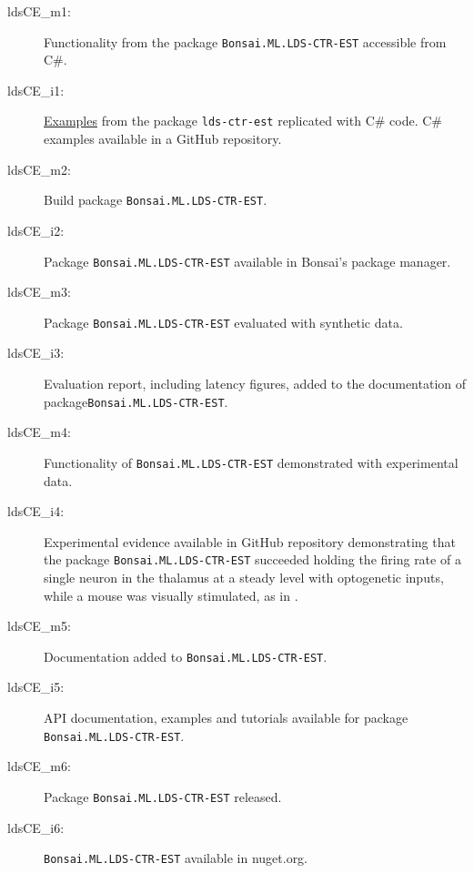 \begin{description}

    \item[ldsCE\_m1:] Functionality from the package
        \texttt{Bonsai.ML.LDS-CTR-EST} accessible from C\#.

    \item[ldsCE\_i1:] \href{https://cloctools.github.io/lds-ctrl-est/docs/api/examples/}{Examples}
        from the package \texttt{lds-ctr-est} replicated with C\# code.
        C\# examples available in a GitHub repository.

    \item[ldsCE\_m2:] Build package \texttt{Bonsai.ML.LDS-CTR-EST}.

    \item[ldsCE\_i2:] Package \texttt{Bonsai.ML.LDS-CTR-EST} available in
        Bonsai's package manager.

    \item[ldsCE\_m3:] Package \texttt{Bonsai.ML.LDS-CTR-EST}
        evaluated with synthetic data.

    \item[ldsCE\_i3:] Evaluation report, including latency figures, added to
        the documentation of package\linebreak\texttt{Bonsai.ML.LDS-CTR-EST}.

    \item[ldsCE\_m4:] Functionality of \texttt{Bonsai.ML.LDS-CTR-EST} demonstrated
        with experimental data.

    \item[ldsCE\_i4:] Experimental evidence available in GitHub repository
        demonstrating that the package\linebreak
        \texttt{Bonsai.ML.LDS-CTR-EST} succeeded holding the firing rate of a
        single neuron in the thalamus at a steady level with optogenetic
        inputs, while a mouse was visually stimulated, as in
        \citet{bolusEtAl21}.

    \item[ldsCE\_m5:] Documentation added to \texttt{Bonsai.ML.LDS-CTR-EST}.

    \item[ldsCE\_i5:] API documentation, examples and tutorials available for
        package \texttt{Bonsai.ML.LDS-CTR-EST}.

    \item[ldsCE\_m6:] Package \texttt{Bonsai.ML.LDS-CTR-EST} released.

    \item[ldsCE\_i6:] \texttt{Bonsai.ML.LDS-CTR-EST} available in nuget.org.

\end{description}

